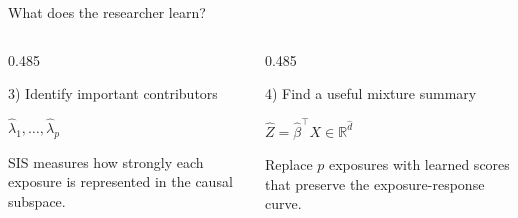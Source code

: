 \documentclass[
  ignorenonframetext,
  aspectratio=169,
  11pt]{beamer}
\begin{document}
\begin{frame}{What does the researcher learn?}
\begin{columns}[T,onlytextwidth]
\begin{column}{0.485\textwidth}
\begin{block}{3) Identify important contributors}
\begin{minipage}[t][1.78cm][t]{\linewidth}
\centering
\vspace*{0.08cm}
\parbox[c][0.76cm][c]{\linewidth}{\centering\Large
  \(\displaystyle \widehat\lambda_1,\ldots,\widehat\lambda_p\)}
\par
\vspace{0.08cm}
\parbox[c][0.64cm][c]{0.94\linewidth}{\centering\scriptsize
  \textcolor{secondarygray}{SIS measures how strongly each exposure is represented in the causal subspace.}}
\end{minipage}
\end{block}
\end{column}

\begin{column}{0.485\textwidth}
\begin{block}{4) Find a useful mixture summary}
\begin{minipage}[t][1.78cm][t]{\linewidth}
\centering
\vspace*{0.08cm}
\parbox[c][0.76cm][c]{\linewidth}{\centering\Large
  \(\displaystyle
    \widehat Z=\widehat\beta^\top X\in\mathbb{R}^{\widehat d}
  \)}
\par
\vspace{0.08cm}
\parbox[c][0.64cm][c]{0.94\linewidth}{\centering\scriptsize
  \textcolor{secondarygray}{Replace \(p\) exposures with learned scores that preserve the exposure-response curve.}}
\end{minipage}
\end{block}
\end{column}
\end{columns}
\end{frame}
\end{document}

